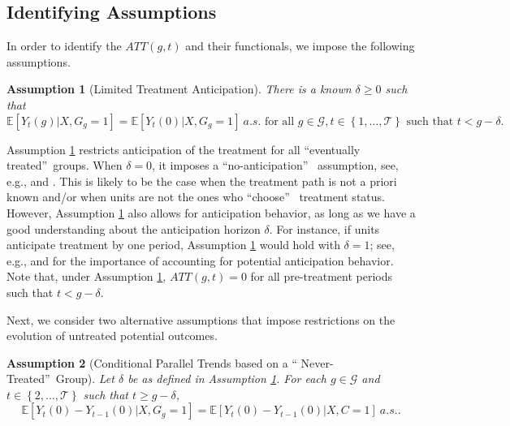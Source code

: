 \documentclass[11pt]{article}%
\theoremstyle{plain}
\newtheorem{assumption}{Assumption}
\numberwithin{sassumption}{section}
\numberwithin{equation}{section}
\begin{document}
\subsection{Identifying Assumptions}

In order to identify the $ATT(g,t)$ and their functionals, we impose the
following assumptions.

\begin{assumption}
[Limited Treatment Anticipation]\label{ass:anticipation} There is a known
$\delta\geq0$ such that
\[
\mathbb{E}[Y_{t}(g)|X,G_{g}=1]=\mathbb{E}[Y_{t}(0)|X,G_{g}=1]~a.s.\text{ for
all }g\in\mathcal{G},t\in\left\{  1,\dots,\mathcal{T}\right\}  \text{ such
that }t<g-\delta.
\]

\end{assumption}

Assumption \ref{ass:anticipation} restricts anticipation of the treatment for
all \textquotedblleft eventually treated\textquotedblright\ groups. When
$\delta=0$, it imposes a \textquotedblleft no-anticipation\textquotedblright%
\ assumption, see, e.g., \cite{Abbring2003} and \cite{Sianesi2004}. This is
likely to be the case when the treatment path is not a priori known and/or
when units are not the ones who \textquotedblleft choose\textquotedblright%
\ treatment status. However, Assumption \ref{ass:anticipation} also allows for
anticipation behavior, as long as we have a good understanding about the
anticipation horizon $\delta$. For instance, if units anticipate treatment by
one period, Assumption \ref{ass:anticipation} would hold with $\delta=1$; see,
e.g., \cite{Laporte2005} and \cite{Malani2015} for the importance of
accounting for potential anticipation behavior. Note that, under Assumption
\ref{ass:anticipation}, $ATT\left(  g,t\right)  =0$ for all pre-treatment periods such that $t<g-\delta$.

Next, we consider two alternative assumptions that impose restrictions on the
evolution of untreated potential outcomes.

\begin{assumption}
[Conditional Parallel Trends based on a \textquotedblleft
Never-Treated\textquotedblright\ Group]\label{ass:common-trends} Let $\delta$
be as defined in Assumption \ref{ass:anticipation}. For each $g\in\mathcal{G}$ and $t\in\left\{
2,\dots,\mathcal{T}\right\} $ such that $t\geq g-\delta$,
\[
\mathbb{E}[Y_{t}(0)-Y_{t-1}(0)|X,G_{g}=1]=\mathbb{E}[Y_{t}(0)-Y_{t-1}%
(0)|X,C=1]~a.s..
\]

\end{assumption}
\end{document}
